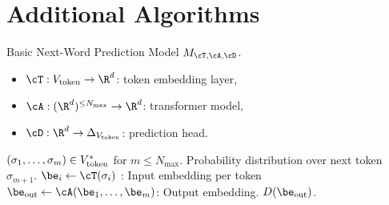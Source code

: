 

\section{Additional Algorithms}\label{sec:add_algorithms}

\begin{algorithm}[t]
\caption{Basic Next-Word Prediction Model $M_{\cT, \cA, \cD}$.}
\label{alg:basic-model}
\begin{algorithmic}
\begin{itemize}[itemsep=-3pt]
    \item $\cT : \Vtoken \to \R^d$: token embedding layer,
    \item $\cA : (\R^d)^{\le N_{\max}} \to \R^d$: transformer model,
    \item $\cD : \R^d \to \Delta_{\Vtoken}$: prediction head.
\end{itemize}
 $(\sigma_1, \ldots, \sigma_m) \in V_{\mathrm{token}}^*$ for $m \le N_{\max}$.
 Probability distribution over next token $\hat{\sigma}_{m+1}$.
    \STATE $\be_i \gets \cT(\sigma_i)$ : Input embedding per token
\ENDFOR
\STATE $\be_{\mathrm{out}} \gets \cA(\be_1, \ldots, \be_m)$: Output embedding.
\RETURN $D(\be_{\mathrm{out}})$.
\end{algorithmic}
\end{algorithm}

